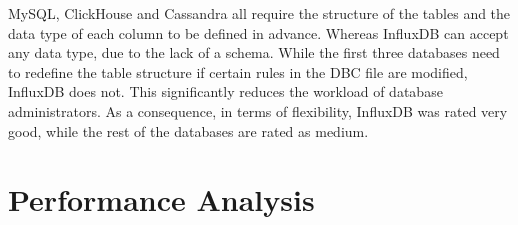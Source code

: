 MySQL, ClickHouse and Cassandra all require the structure of the tables and the data type of each column to be defined in advance. Whereas InfluxDB can accept any data type, due to the lack of a schema. While the first three databases need to redefine the table structure if certain rules in the DBC file are modified, InfluxDB does not. This significantly reduces the workload of database administrators. As a consequence, in terms of flexibility, InfluxDB was rated very good, while the rest of the databases are rated as medium.

\section{Performance Analysis}

\begin{table}[hbt!]
\centering
{}
\caption{Result of Weighted sum mod}
\label{tab:result_lsm}
\end{table}

